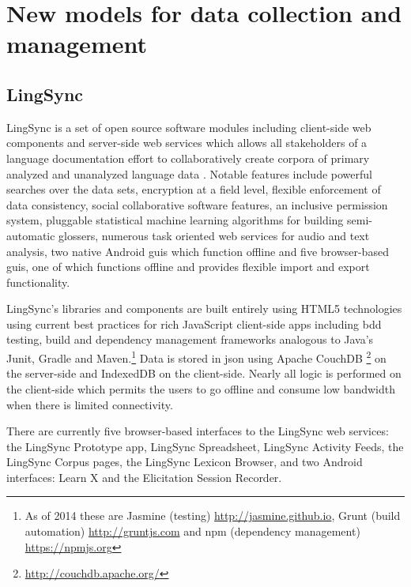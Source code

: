 \documentclass[11pt]{article}
\begin{document}
\section{New models for data collection and management}


\subsection{LingSync}\label{sec:lingsync}

LingSync is a set of open source software modules including client-side web
components and  server-side web services which allows all stakeholders of a language documentation effort to
collaboratively create corpora of primary analyzed and unanalyzed language data
\cite{lingsync:2012}. Notable features include powerful searches over the data
sets, encryption at a field level, flexible enforcement of data consistency, social collaborative software features, an
inclusive permission system, pluggable statistical machine learning algorithms for building
semi-automatic glossers, numerous task oriented web services for audio and text analysis, two native Android \glspl{gui} which function offline and five browser-based \glspl{gui},
one of which functions offline and provides flexible import and export functionality. 


LingSync's libraries and components are built entirely using HTML5 technologies using current best practices for rich JavaScript client-side apps including \gls{bdd} testing, build and dependency management frameworks analogous to Java's Junit, Gradle and Maven.\footnote{As of 2014 these are Jasmine (testing) \url{http://jasmine.github.io}, Grunt (build automation) \url{http://gruntjs.com} and \gls{npm} (dependency management) \url{https://npmjs.org}}
Data is stored in \gls{json} using Apache CouchDB%
\footnote{\url{http://couchdb.apache.org/}} %
on the server-side and IndexedDB on the client-side.  Nearly all logic is performed on the client-side which permits the users to go offline and consume low bandwidth when there is limited connectivity.


There are currently five browser-based interfaces to the LingSync web services:
the LingSync Prototype app, LingSync Spreadsheet, LingSync Activity Feeds, the
LingSync Corpus pages,  the LingSync Lexicon Browser, and two Android interfaces: Learn X and the Elicitation Session Recorder.
\end{document}

